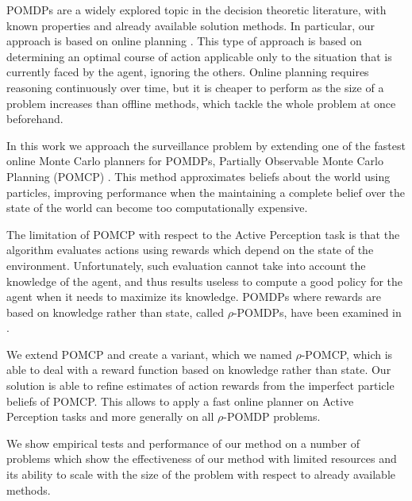 POMDPs are a widely explored topic in the decision theoretic literature, with known properties and
already available solution methods. In particular, our approach is based on online planning
\cite{cit:relworkonlineall}. This type of approach is based on determining an optimal course of
action applicable only to the situation that is currently faced by the agent, ignoring the others.
Online planning requires reasoning continuously over time, but it is cheaper to perform as the size
of a problem increases than offline methods, which tackle the whole problem at once beforehand.


In this work we approach the surveillance problem by extending one of the fastest online Monte Carlo
planners for POMDPs, Partially Observable Monte Carlo Planning (POMCP) \cite{cit:pomcp}. This
method approximates beliefs about the world using particles, improving performance when the
maintaining a complete belief over the state of the world can become too computationally expensive.

The limitation of POMCP with respect to the Active Perception task is that the algorithm evaluates
actions using rewards which depend on the state of the environment. Unfortunately, such evaluation
cannot take into account the knowledge of the agent, and thus results useless to compute a good
policy for the agent when it needs to maximize its knowledge. POMDPs where rewards are based on
knowledge rather than state, called $\rho$-POMDPs, have been examined in \cite{cit:rpomdp}.


We extend POMCP and create a variant, which we named $\rho$-POMCP, which is able to deal with a
reward function based on knowledge rather than state. Our solution is able to refine estimates of
action rewards from the imperfect particle beliefs of POMCP. This allows to apply a fast online
planner on Active Perception tasks and more generally on all $\rho$-POMDP problems.


We show empirical tests and performance of our method on a number of problems which show the
effectiveness of our method with limited resources and its ability to scale with the size of the
problem with respect to already available methods.


